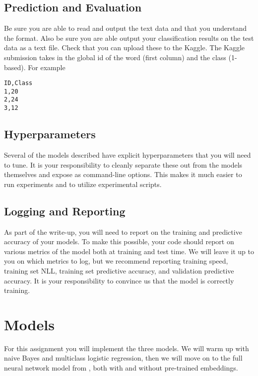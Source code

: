 \documentclass[11pt]{article}
\begin{document}
\subsection{Prediction and Evaluation}

Be sure you are able to read and output the text data and that you
understand the format.  Also be sure you are able output your
classification results on the test data as a text file. Check that you
can upload these to the Kaggle. The Kaggle submission takes in the
global id of the word (first column) and the class (1-based). For
example

\begin{verbatim}
ID,Class
1,20
2,24
3,12
\end{verbatim}

\subsection{Hyperparameters}

Several of the models described have explicit hyperparameters that you will 
need to tune. It is your responsibility to cleanly separate these out from 
the models themselves and expose as command-line options. This makes it much 
easier to run experiments and to utilize experimental scripts. 

\subsection{Logging and Reporting}

As part of the write-up, you will need to report on the training and
predictive accuracy of your models. To make this possible, your code
should report on various metrics of the model both at training and
test time. We will leave it up to you on which metrics to log, but we
recommend reporting training speed, training set NLL, training set
predictive accuracy, and validation predictive accuracy. It is your
responsibility to convince us that the model is correctly training.

\section{Models}

For this assignment you will implement the three models. We will warm
up with naive Bayes and multiclass logistic regression, then we will
move on to the full neural network model from
\citet{collobert2011natural}, both with and without pre-trained embeddings.
\end{document}
